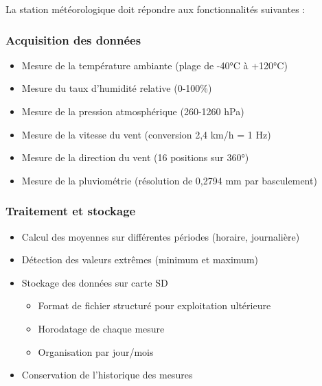 \documentclass[12pt]{article}
\begin{document}
La station météorologique doit répondre aux fonctionnalités suivantes :

\subsubsection{Acquisition des données}
\begin{itemize}
    \item Mesure de la température ambiante (plage de -40°C à +120°C)
    \item Mesure du taux d'humidité relative (0-100\%)
    \item Mesure de la pression atmosphérique (260-1260 hPa)
    \item Mesure de la vitesse du vent (conversion 2,4 km/h = 1 Hz)
    \item Mesure de la direction du vent (16 positions sur 360°)
    \item Mesure de la pluviométrie (résolution de 0,2794 mm par basculement)
\end{itemize}

\subsubsection{Traitement et stockage}
\begin{itemize}
    \item Calcul des moyennes sur différentes périodes (horaire, journalière)
    \item Détection des valeurs extrêmes (minimum et maximum)
    \item Stockage des données sur carte SD
    \begin{itemize}
        \item Format de fichier structuré pour exploitation ultérieure
        \item Horodatage de chaque mesure
        \item Organisation par jour/mois
    \end{itemize}
    \item Conservation de l'historique des mesures
\end{itemize}
\end{document}
